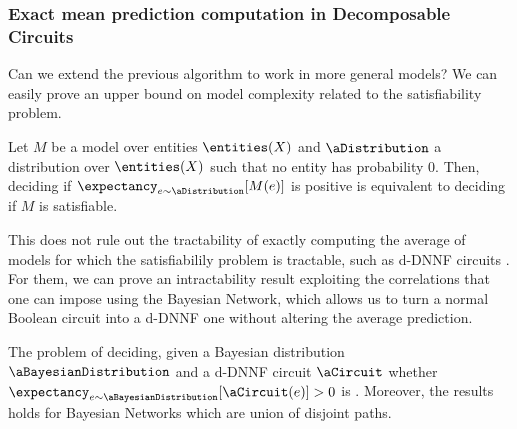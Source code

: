 \subsubsection{Exact mean prediction computation in Decomposable Circuits}

Can we extend the previous algorithm to work in more general models? We can easily prove an upper bound on model complexity related to the satisfiability problem.

\begin{proposition}
    Let $M$ be a model over entities $\entities(X)$ and $\aDistribution$ a distribution over $\entities(X)$ such that no entity has probability 0. Then, deciding if $\expectancy_{e\sim \aDistribution}[M(e)]$ is positive is equivalent to deciding if $M$ is satisfiable.
\end{proposition}

This does not rule out the tractability of exactly computing the average of models for which the satisfiabilily problem is tractable, such as d-DNNF circuits \cite{arenas2021tractability}. For them, we can prove an intractability result exploiting the correlations that one can impose using the Bayesian Network, which allows us to turn a normal Boolean circuit into a d-DNNF one without altering the average prediction.

\begin{proposition}
    The problem of deciding, given a Bayesian distribution $\aBayesianDistribution$ and a d-DNNF circuit $\aCircuit$ whether $\expectancy_{e \sim \aBayesianDistribution}[\aCircuit(e)] > 0$ is \NPhard{}. Moreover, the results holds for Bayesian Networks which are union of disjoint paths.
\end{proposition}

